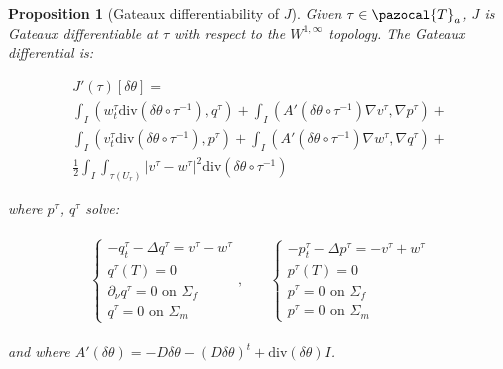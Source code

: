 \documentclass[english,a4paper,9pt,oneside]{scrbook}	%
\theoremstyle{break}
\newtheorem{prop}[equation]{Proposition}
\theoremstyle{remark}
\newcommand{\cT}{\pazocal{T}}
\newcommand{\te}{\theta}
\newcommand{\dive}{\text{div}}
\begin{document}
\begin{prop}[Gateaux differentiability of $J$]
\label{prop:gateaux_diff}
Given $\tau \in \cT_a$, $J$ is Gateaux differentiable at $\tau$ with respect to the $W^{1,\infty}$ topology. The Gateaux differential is:


\begin{align*}
J'(\tau)[\delta \te] =\\ \int_I (w_t^\tau \dive(\delta \te\circ  \tau^{-1}), q^\tau )+ \int_I (A'(\delta\te \circ \tau^{-1})\nabla v^\tau, \nabla p^\tau)+\\
\int_I (v_t^\tau \dive(\delta \te\circ  \tau^{-1}), p^\tau )+ \int_I (A'(\delta\te \circ \tau^{-1})\nabla w^\tau, \nabla q^\tau)+\\
\frac{1}{2}\int_I\int_{\tau(U_r)}|v^\tau-w^\tau|^2\dive(\delta \te\circ  \tau^{-1})
\end{align*}

where $p^\tau$, $q^\tau$ solve:

\begin{align*}
\begin{matrix}
\left\{\begin{matrix}
-q^\tau_t-\Delta q^\tau =v^\tau-w^\tau\\
q^\tau(T)=0\\
\partial_\nu q^\tau = 0 \text{ on } \Sigma_f\\
q^\tau = 0 \text{ on } \Sigma_m
\end{matrix}\right., \quad & \left\{\begin{matrix}
-p^\tau_t-\Delta p^\tau = - v^\tau+ w^\tau \\
p^\tau(T)=0\\
p^\tau = 0 \text{ on } \Sigma_f \\
p^\tau = 0 \text{ on } \Sigma_m
\end{matrix}\right.
\end{matrix}
\end{align*}

and where $A'(\delta\te )= - D\delta \te -(D\delta\te)^t + \dive(\delta\te)I$.

\end{prop}
\end{document}
